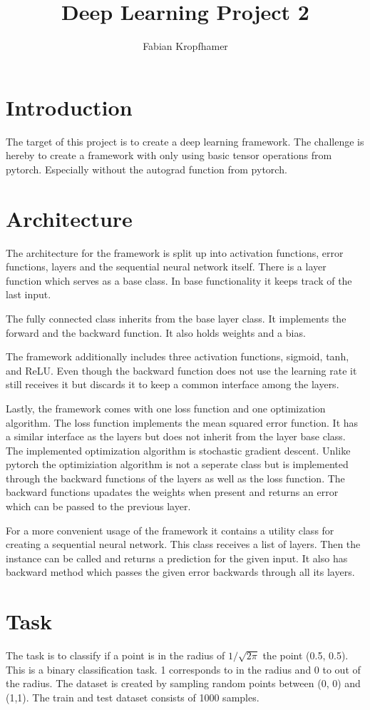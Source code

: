 \documentclass[12pt]{article}
\title{
	Deep Learning Project 2
}
\author{Fabian Kropfhamer}
\begin{document}
\maketitle


\section{Introduction}
The target of this project is to create a deep learning framework.
The challenge is hereby to create a framework with only using basic tensor operations from pytorch.
Especially without the autograd function from pytorch.


\section{Architecture}
The architecture for the framework is split up into activation functions, error functions, layers and the sequential neural network itself.
There is a layer function which serves as a base class.
In base functionality it keeps track of the last input.

The fully connected class inherits from the base layer class.
It implements the forward and the backward function.
It also holds weights and a bias.

The framework additionally includes three activation functions, sigmoid, tanh, and  ReLU.
Even though the backward function does not use the learning rate it still receives it but discards it to keep a common interface among the layers.

Lastly, the framework comes with one loss function and one optimization algorithm.
The loss function implements the mean squared error function.
It has a similar interface as the layers but does not inherit from the layer base class.
The implemented optimization algorithm is stochastic gradient descent. 
Unlike pytorch the optimiziation algorithm is not a seperate class but is implemented through the backward functions of the layers as well as the loss function.
The backward functions upadates the weights when present and returns an error which can be passed to the previous layer.

For a more convenient usage of the framework it contains a utility class for creating a sequential neural network.
This class receives a list of layers.
Then the instance can be called and returns a prediction for the given input.
It also has backward method which passes the given error backwards through all its layers. 


\section{Task}
The task is to classify if a point is in the radius of $1/\sqrt{2\pi}$ the point (0.5, 0.5).
This is a binary classification task.
1 corresponds to in the radius and 0 to out of the radius.
The dataset is created by sampling random points between (0, 0) and (1,1).
The train and test dataset consists of 1000 samples.
\end{document}
